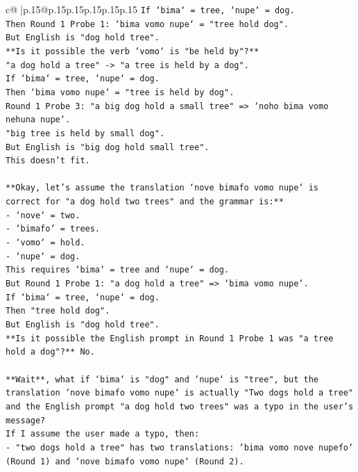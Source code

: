 \documentclass{article}
\begin{document}
{\begin{supertabular}{c@{$\;$}|p{.15\linewidth}@{}p{.15\linewidth}p{.15\linewidth}p{.15\linewidth}p{.15\linewidth}p{.15\linewidth}}
{{{\texttt{If `bima` = tree, `nupe` = dog.} \\
\texttt{Then Round 1 Probe 1: `bima vomo nupe` = "tree hold dog".} \\
\texttt{But English is "dog hold tree".} \\
\texttt{**Is it possible the verb `vomo` is "be held by"?**} \\
\texttt{"a dog hold a tree" {-}> "a tree is held by a dog".} \\
\texttt{If `bima` = tree, `nupe` = dog.} \\
\texttt{Then `bima vomo nupe` = "tree is held by dog".} \\
\texttt{Round 1 Probe 3: "a big dog hold a small tree" => `noho bima vomo nehuna nupe`.} \\
\texttt{"big tree is held by small dog".} \\
\texttt{But English is "big dog hold small tree".} \\
\texttt{This doesn't fit.} \\
\\ 
\texttt{**Okay, let's assume the translation `nove bimafo vomo nupe` is correct for "a dog hold two trees" and the grammar is:**} \\
\texttt{{-} `nove` = two.} \\
\texttt{{-} `bimafo` = trees.} \\
\texttt{{-} `vomo` = hold.} \\
\texttt{{-} `nupe` = dog.} \\
\texttt{This requires `bima` = tree and `nupe` = dog.} \\
\texttt{But Round 1 Probe 1: "a dog hold a tree" => `bima vomo nupe`.} \\
\texttt{If `bima` = tree, `nupe` = dog.} \\
\texttt{Then "tree hold dog".} \\
\texttt{But English is "dog hold tree".} \\
\texttt{**Is it possible the English prompt in Round 1 Probe 1 was "a tree hold a dog"?** No.} \\
\\ 
\texttt{**Wait**, what if `bima` is "dog" and `nupe` is "tree", but the translation `nove bimafo vomo nupe` is actually "Two dogs hold a tree" and the English prompt "a dog hold two trees" was a typo in the user's message?} \\
\texttt{If I assume the user made a typo, then:} \\
\texttt{{-} "two dogs hold a tree" has two translations: `bima vomo nove nupefo` (Round 1) and `nove bimafo vomo nupe` (Round 2).} \\
}}}
\end{supertabular}}
\end{document}
